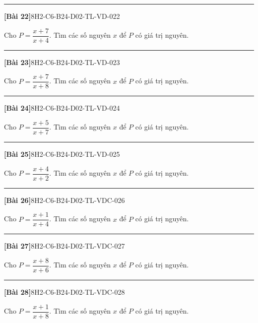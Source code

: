 \documentclass[12pt,a4paper]{article}
\newif\ifloigiai
\newenvironment{cauhoi}[2]{%
  \par\medskip\noindent\rule{\textwidth}{0.4pt}\par\nopagebreak
  \noindent\textbf{[#1]}\hfill{\scriptsize\ttfamily #2}\par\nopagebreak\smallskip}{\par}
\newcommand{\loigiai}[1]{\ifloigiai\par\smallskip\noindent\textit{Lời giải.} #1\par\fi}
\begin{document}
\begin{cauhoi}{Bài 22}{8H2-C6-B24-D02-TL-VD-022}
Cho $P=\dfrac{x+7}{x+4}$. Tìm các số nguyên $x$ để $P$ có giá trị nguyên.
\loigiai{Viết $P=\dfrac{(x+4)+3}{x+4}=1+\dfrac{3}{x+4}$. $P$ nguyên khi $x+4$ là ước của $3$, tức $x+4\in\{-3; -1; 1; 3\}$. Suy ra $x\in\{-7; -5; -3; -1\}$.}
\end{cauhoi}
\begin{cauhoi}{Bài 23}{8H2-C6-B24-D02-TL-VD-023}
Cho $P=\dfrac{x+7}{x+8}$. Tìm các số nguyên $x$ để $P$ có giá trị nguyên.
\loigiai{Viết $P=\dfrac{(x+8)-1}{x+8}=1+\dfrac{-1}{x+8}$. $P$ nguyên khi $x+8$ là ước của $-1$, tức $x+8\in\{-1; 1\}$. Suy ra $x\in\{-9; -7\}$.}
\end{cauhoi}
\begin{cauhoi}{Bài 24}{8H2-C6-B24-D02-TL-VD-024}
Cho $P=\dfrac{x+5}{x+7}$. Tìm các số nguyên $x$ để $P$ có giá trị nguyên.
\loigiai{Viết $P=\dfrac{(x+7)-2}{x+7}=1+\dfrac{-2}{x+7}$. $P$ nguyên khi $x+7$ là ước của $-2$, tức $x+7\in\{-2; -1; 1; 2\}$. Suy ra $x\in\{-9; -8; -6; -5\}$.}
\end{cauhoi}
\begin{cauhoi}{Bài 25}{8H2-C6-B24-D02-TL-VD-025}
Cho $P=\dfrac{x+4}{x+2}$. Tìm các số nguyên $x$ để $P$ có giá trị nguyên.
\loigiai{Viết $P=\dfrac{(x+2)+2}{x+2}=1+\dfrac{2}{x+2}$. $P$ nguyên khi $x+2$ là ước của $2$, tức $x+2\in\{-2; -1; 1; 2\}$. Suy ra $x\in\{-4; -3; -1; 0\}$.}
\end{cauhoi}
\begin{cauhoi}{Bài 26}{8H2-C6-B24-D02-TL-VDC-026}
Cho $P=\dfrac{x+1}{x+4}$. Tìm các số nguyên $x$ để $P$ có giá trị nguyên.
\loigiai{Viết $P=\dfrac{(x+4)-3}{x+4}=1+\dfrac{-3}{x+4}$. $P$ nguyên khi $x+4$ là ước của $-3$, tức $x+4\in\{-3; -1; 1; 3\}$. Suy ra $x\in\{-7; -5; -3; -1\}$.}
\end{cauhoi}
\begin{cauhoi}{Bài 27}{8H2-C6-B24-D02-TL-VDC-027}
Cho $P=\dfrac{x+8}{x+6}$. Tìm các số nguyên $x$ để $P$ có giá trị nguyên.
\loigiai{Viết $P=\dfrac{(x+6)+2}{x+6}=1+\dfrac{2}{x+6}$. $P$ nguyên khi $x+6$ là ước của $2$, tức $x+6\in\{-2; -1; 1; 2\}$. Suy ra $x\in\{-8; -7; -5; -4\}$.}
\end{cauhoi}
\begin{cauhoi}{Bài 28}{8H2-C6-B24-D02-TL-VDC-028}
Cho $P=\dfrac{x+1}{x+8}$. Tìm các số nguyên $x$ để $P$ có giá trị nguyên.
\loigiai{Viết $P=\dfrac{(x+8)-7}{x+8}=1+\dfrac{-7}{x+8}$. $P$ nguyên khi $x+8$ là ước của $-7$, tức $x+8\in\{-7; -1; 1; 7\}$. Suy ra $x\in\{-15; -9; -7; -1\}$.}
\end{cauhoi}
\end{document}
